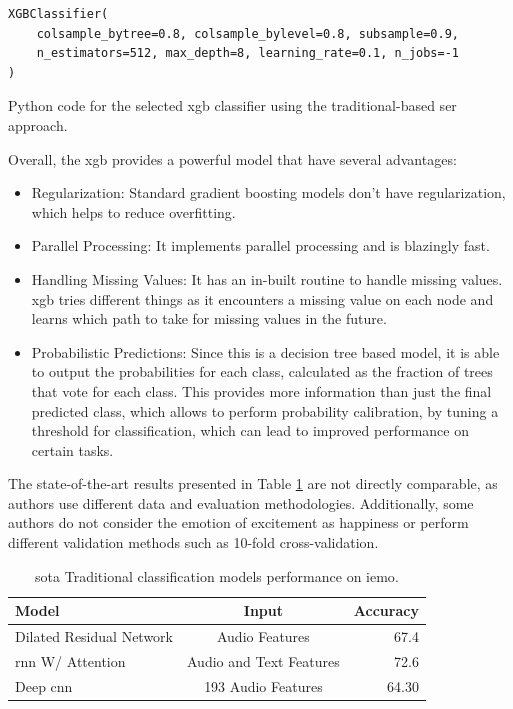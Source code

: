 \begin{listing}[H]
	\begin{verbatim}
XGBClassifier(
	colsample_bytree=0.8, colsample_bylevel=0.8, subsample=0.9,
	n_estimators=512, max_depth=8, learning_rate=0.1, n_jobs=-1
)
	\end{verbatim}
	\caption{Python code for the selected \ac{xgb} classifier using the traditional-based \ac{ser} approach.}
	\label{tra:code}
\end{listing}

Overall, the \ac{xgb} provides a powerful model that have several advantages:

\begin{itemize}
	\item Regularization: Standard gradient boosting models don't have regularization, which helps to reduce overfitting.
	
	\item Parallel Processing: It implements parallel processing and is blazingly fast.

	\item Handling Missing Values: It has an in-built routine to handle missing values. \ac{xgb} tries different things as it encounters a missing value on each node and learns which path to take for missing values in the future.
	
	\item Probabilistic Predictions: Since this is a decision tree based model, it is able to output the probabilities for each class, calculated as the fraction of trees that vote for each class. This provides more information than just the final predicted class, which allows to perform probability calibration, by tuning a threshold for classification, which can lead to improved performance on certain tasks.
	
\end{itemize}

The state-of-the-art results presented in Table \ref{tab:modelssoa} are not directly comparable, as authors use different data and evaluation methodologies. Additionally, some authors do not consider the emotion of excitement as happiness or perform different validation methods such as 10-fold cross-validation.

\begin{table}[H]
	\centering
	\caption{\ac{sota} Traditional classification models performance on \ac{iemo}.}
	\label{tab:modelssoa}
	\begin{tabular}{lcr}
		\toprule
		Model                        &   Input &   Accuracy \\
		\midrule
		
		Dilated Residual Network \cite{Li_2019}	& Audio Features & 67.4 \\
		
		\ac{rnn} W/ Attention \cite{Lu_2020} & Audio and Text Features & 72.6 \\
		
		Deep \ac{cnn} \cite{Issa_2020} & 193 Audio Features & 64.30 \\
		
		\bottomrule
	\end{tabular}
\end{table}